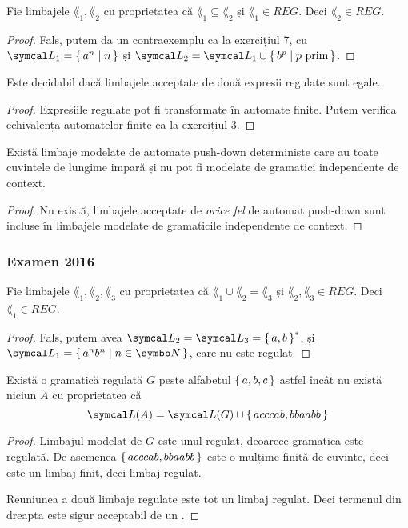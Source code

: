 \begin{exercise}
    Fie limbajele \(\lang_1, \lang_2\) cu proprietatea că \(\lang_1 \subseteq \lang_2\) și \(\lang_1 \in REG\). Deci \(\lang_2 \in REG\).
\end{exercise}
\begin{proof}
    Fals, putem da un contraexemplu ca la exercițiul 7, cu \(\lang_1 = \set{ a^n | n  }\) și \(\lang_2 = \lang_1 \cup \set{ b^p | p \text{ prim}}\).
\end{proof}

\begin{exercise}
    Este decidabil dacă limbajele acceptate de două expresii regulate sunt egale.
\end{exercise}
\begin{proof}
    Expresiile regulate pot fi transformate în automate finite. Putem verifica echivalența automatelor finite ca la exercițiul 3.
\end{proof}

\begin{exercise}
    Există limbaje modelate de automate push-down deterministe care au toate cuvintele de lungime impară și nu pot fi modelate de gramatici independente de context.
\end{exercise}
\begin{proof}
    Nu există, limbajele acceptate de \emph{orice fel} de automat push-down sunt incluse în limbajele modelate de gramaticile independente de context.
\end{proof}

\subsubsection*{Examen 2016}

\begin{exercise}
    Fie limbajele \(\lang_1, \lang_2, \lang_3\) cu proprietatea că \(\lang_1 \cup \lang_2 = \lang_3\) și \(\lang_2, \lang_3 \in REG\). Deci \(\lang_1 \in REG\).
\end{exercise}
\begin{proof}
    Fals, putem avea \(\lang_2 = \lang_3 = \set{ a, b }^*\), și \(\lang_1 = \set{ a^n b^n | n \in \naturals}\), care nu este regulat.
\end{proof}

\begin{exercise}
    Există o gramatică regulată \(G\) peste alfabetul \(\set{ a, b, c }\) astfel încât nu există niciun \nfa{} \(A\) cu proprietatea că
    \[\lang(A) = \lang(G) \cup \set{ acccab, bbaabb }\]
\end{exercise}
\begin{proof}
    Limbajul modelat de \(G\) este unul regulat, deoarece gramatica este regulată. De asemenea \(\set{ acccab, bbaabb }\) este o mulțime finită de cuvinte, deci este un limbaj finit, deci limbaj regulat.

    Reuniunea a două limbaje regulate este tot un limbaj regulat. Deci termenul din dreapta este sigur acceptabil de un \nfa{}.
\end{proof}

